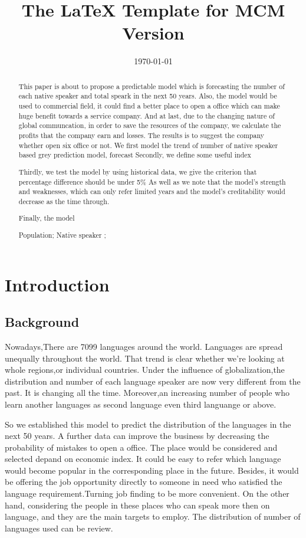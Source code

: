 \documentclass{mcmthesis}
\title{The \LaTeX{} Template for MCM Version \MCMversion}
\date{\today}
\begin{document}
\begin{abstract}
\qquad This paper is about to propose a predictable model which is forecasting the number of each native speaker and total speark in the next 50 years.
Also, the model would be used to commercial field, it could find a better place to open a office which can make huge benefit towards a service company.
And at last, due to the changing nature of global communcation, in order to save the resources of the company, we calculate the profits that the company earn and losses.
The results is to suggest the company whether open six office or not.
We first model the trend of number of native speaker based grey prediction model, forecast 
Secondly, we define some useful index

Thirdly, we test the model by using historical data, we give the criterion that percentage difference should be under 5\%
As well as we note that the model's strength and weaknesses, which can only refer limited years and the model's creditability would decrease as the time through.


Finally, the model 

\begin{keywords}
Population; Native speaker ; 
\end{keywords}
\end{abstract}
\maketitle
\tableofcontents
\section{Introduction}
\subsection{Background}
\qquad Nowadays,There are 7099 languages around the world. Languages are spread unequally throughout the world. 
That trend is clear whether we’re looking at whole regions,or individual countries.
Under the influence of globalization,the distribution and number of each language speaker are now very different from the past. 
It is changing all the time.
\cite{No-of-languages}
Moreover,an increasing number of people who learn another languages as second language even third languange or above. 

So we established this model to predict the distribution of the languages in the next 50 years. A further data can improve the business by decreasing
the probability of mistakes to open a office. The place would be considered and selected depand on economic index.
It could be easy to refer which language would become popular in the corresponding place in the future. Besides,
it would be offering the job opportunity directly to someone in need who satisfied the language requirement.Turning job finding to be more convenient.
On the other hand, considering the people in these places who can speak more then on language, and they are the 
main targets to employ. The distribution of number of languages used can be review.
 
\end{document}
